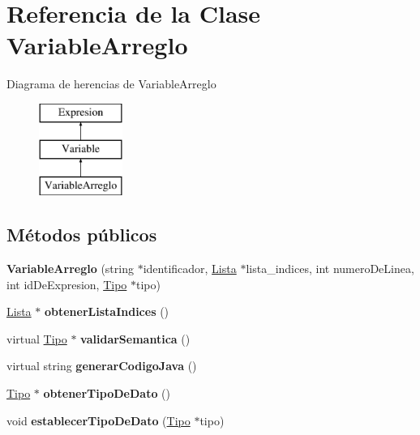 \hypertarget{class_variable_arreglo}{\section{Referencia de la Clase Variable\-Arreglo}
\label{class_variable_arreglo}
}
Diagrama de herencias de Variable\-Arreglo\begin{figure}[H]
\begin{center}
\leavevmode
\includegraphics[height=3.000000cm]{class_variable_arreglo}
\end{center}
\end{figure}
\subsection*{Métodos públicos}
\begin{DoxyCompactItemize}
\item 
\hypertarget{class_variable_arreglo_ab750a4562af1f850829dc3fde5b8dacb}{{\bfseries Variable\-Arreglo} (string $\ast$identificador, \hyperlink{class_lista}{Lista} $\ast$lista\-\_\-indices, int numero\-De\-Linea, int id\-De\-Expresion, \hyperlink{class_tipo}{Tipo} $\ast$tipo)}\label{class_variable_arreglo_ab750a4562af1f850829dc3fde5b8dacb}

\item 
\hypertarget{class_variable_arreglo_ada11d63f01fef9731189010499924122}{\hyperlink{class_lista}{Lista} $\ast$ {\bfseries obtener\-Lista\-Indices} ()}\label{class_variable_arreglo_ada11d63f01fef9731189010499924122}

\item 
\hypertarget{class_variable_arreglo_a777fb0f24f7dde36c6376f771056106d}{virtual \hyperlink{class_tipo}{Tipo} $\ast$ {\bfseries validar\-Semantica} ()}\label{class_variable_arreglo_a777fb0f24f7dde36c6376f771056106d}

\item 
\hypertarget{class_variable_arreglo_ab2fbb0964c461cf11805e3b011441eae}{virtual string {\bfseries generar\-Codigo\-Java} ()}\label{class_variable_arreglo_ab2fbb0964c461cf11805e3b011441eae}

\item 
\hypertarget{class_variable_arreglo_a41ee995a27a60750ab42ef33bd182ef0}{\hyperlink{class_tipo}{Tipo} $\ast$ {\bfseries obtener\-Tipo\-De\-Dato} ()}\label{class_variable_arreglo_a41ee995a27a60750ab42ef33bd182ef0}

\item 
\hypertarget{class_variable_arreglo_a3e8390dc2deac6bc3094f8cf6ecdc4ed}{void {\bfseries establecer\-Tipo\-De\-Dato} (\hyperlink{class_tipo}{Tipo} $\ast$tipo)}\label{class_variable_arreglo_a3e8390dc2deac6bc3094f8cf6ecdc4ed}

\end{DoxyCompactItemize}
